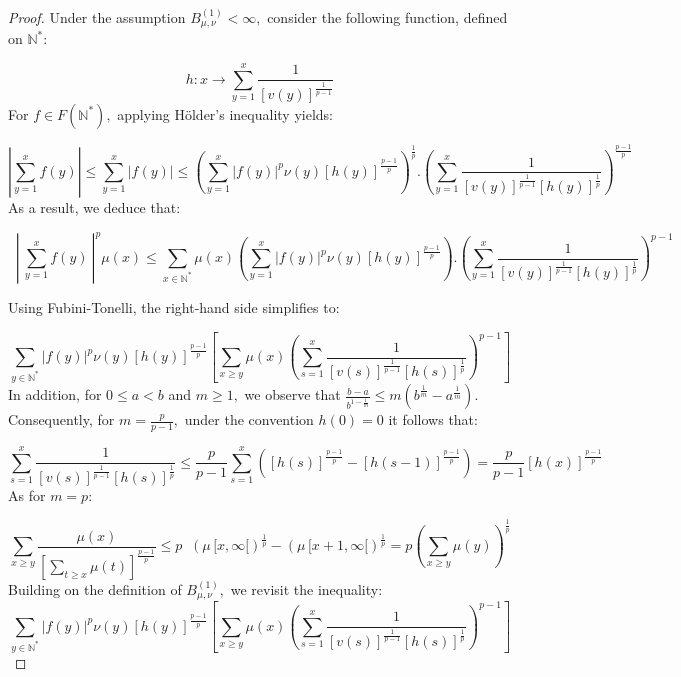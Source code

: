 \documentclass[11pt]{amsart}
\newcommand{\1}{[1]}
\begin{document}
\begin{proof} Under the assumption 
$B_{\mu,\nu}^{(1)} < \infty,$ consider the following function, defined on $\mathbb{N}^{*}:$

$$h:x \to \displaystyle \sum_{y = 1}^{x} \frac{1}{\left[ v(y) \right]^{\frac{1}{p-1}}}$$
For $f \in F(\mathbb{N}^{*}),$ applying H\"older's inequality yields:

$$ \left| \sum_{y=1}^{x} f(y)  \right| \leq  \sum_{y=1}^{x} |f(y)| 
\leq \left( \sum_{y=1}^{x} |f(y)|^p \nu(y) [h(y)]^{\frac{p-1}{p}} \right)^{\frac{1}{p}}. \left( \sum_{y = 1}^{x} \frac{1}{\left[v(y)\right]^{\frac{1}{p-1}}  \left[h(y)\right]^{\frac{1}{p}}} \right)^{\frac{p-1}{p}}$$
As a result, we deduce that:

$$ \mathop{\sum_{x \in \mathbb{N}^{*}}} \left| \ \sum_{y=1}^{x} f(y) \  \right|^{p} \mu(x) \leq  \sum_{x \in \mathbb{N}^{*}} \mu(x) \left( \sum_{y=1}^{x} |f(y)|^p \nu(y) [h(y)]^{\frac{p-1}{p}} \right). \left( \sum_{y = 1}^{x} \frac{1}{\left[v(y)\right]^{\frac{1}{p-1}}  \left[h(y)\right]^{\frac{1}{p}}} \right)^{p-1}$$
\newpage

Using Fubini-Tonelli, the right-hand side simplifies to:

$$\sum_{y \in \mathbb{N}^{*}} |f(y)|^{p}\nu(y) [h(y)]^{\frac{p-1}{p}}   \left[ \sum_{x \geq y} \mu(x) \left( \sum_{s = 1}^{x} \frac{1}{\left[v(s)\right]^{\frac{1}{p-1}}  \left[h(s)\right]^{\frac{1}{p}}} \right)^{p-1} \right]
$$
In addition, for $0\leq a<b$ and $m\geq1,$ we observe that $\frac{b-a}{b^{1-\frac{1}{m}}} \leq m (b^{\frac{1}{m}}- a^{\frac{1}{m}}).$ Consequently, for $m=\frac{p}{p-1},$ under the convention $h(0)=0$ it follows that:

$$
\sum_{s=1}^{x} \frac{1}{\left[v(s)\right]^{\frac{1}{p-1}}  \left[h(s)\right]^{\frac{1}{p}}} \leq   \frac{p}{p-1} \sum_{s=1}^{x} ([h(s)]^{\frac{p-1}{p}}-  [h(s-1)]^{\frac{p-1}{p}}) = \frac{p}{p-1} [h(x)]^{\frac{p-1}{p}} 
$$
As for $m=p:$


$$\sum_{x\geq y} \frac{\mu(x)}{ \left[\displaystyle \sum_{t\geq x} \mu(t) \right] ^{\frac{p-1}{p}}} \leq p  \mathop{\sum_{x\geq y}}  (\mu \,[x,\infty[)^{\frac{1}{p}} - (\mu\, [x+1,\infty[)^{\frac{1}{p}} = p \left(\sum_{x\geq y} \mu (y) \right)^{\frac{1}{p}}
$$
Building on the definition of
$B_{\mu,\nu}^{(1)},$ we revisit the inequality:
$$
\sum_{y \in \mathbb{N}^{*}} |f(y)|^{p}\nu(y) [h(y)]^{\frac{p-1}{p}}   \left[ \sum_{x \geq y} \mu(x) \left( \sum_{s = 1}^{x} \frac{1}{\left[v(s)\right]^{\frac{1}{p-1}}  \left[h(s)\right]^{\frac{1}{p}}} \right)^{p-1} \right] $$


\end{proof}
\end{document}
